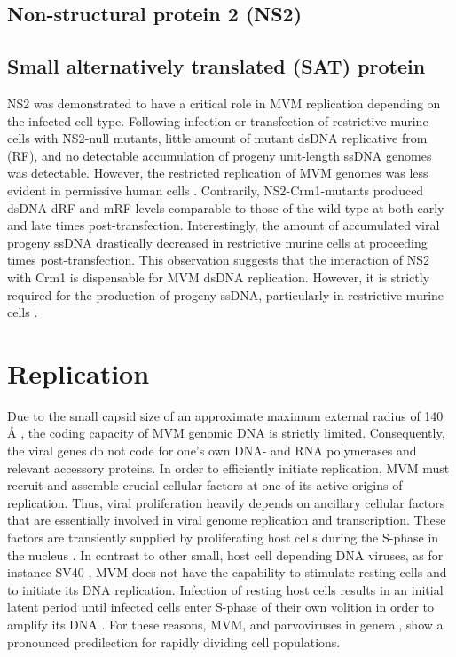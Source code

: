 
\subsection{Non-structural protein 2 (NS2)}

\subsection{Small alternatively translated (SAT) protein}
NS2 was demonstrated to have a critical role in MVM replication depending on the infected cell type. Following infection or transfection of restrictive murine cells with NS2-null mutants, little amount of mutant dsDNA replicative from (RF), and no detectable accumulation of progeny unit-length ssDNA genomes was detectable. However, the restricted replication of MVM genomes was less evident in permissive human cells \cite{pmid2147041}. Contrarily, NS2-Crm1-mutants produced dsDNA dRF and mRF levels comparable to those of the wild type at both early and late times post-transfection. Interestingly, the amount of accumulated viral progeny ssDNA drastically decreased in restrictive murine cells at proceeding times post-transfection. This observation suggests that the interaction of NS2 with Crm1 is dispensable for MVM dsDNA replication. However, it is strictly required for the production of progeny ssDNA, particularly in restrictive murine cells \cite{pmid11884550}.  




\section{Replication}
\label{Replication}
Due to the small capsid size of an approximate maximum external radius of 140 \r{A} \cite{pmid15299974}, the coding capacity of MVM genomic DNA is strictly limited. Consequently, the viral genes do not code for one's own DNA- and RNA polymerases and relevant accessory proteins. In order to efficiently initiate replication, MVM must recruit and assemble crucial cellular factors at one of its active origins of replication. Thus, viral proliferation heavily depends on ancillary cellular factors that are essentially involved in viral genome replication and transcription. These factors are transiently supplied by proliferating host cells during the S-phase in the nucleus \cite{pmid16789120, pmid6602221, pmid3005655, pmid3296697, pmid9418888, pmid4673484, S-phase}. In contrast to other small, host cell depending DNA viruses, as for instance SV40 \cite{pmid4291013, pmid16578647}, MVM does not have the capability to stimulate resting cells and to initiate its DNA replication. Infection of resting host cells results in an initial latent period until infected cells enter S-phase of their own volition in order to amplify its DNA \cite{pmid4673484, pmid3346950, pmid10792046}. For these reasons, MVM, and parvoviruses in general, show a pronounced predilection for rapidly dividing cell populations. 

